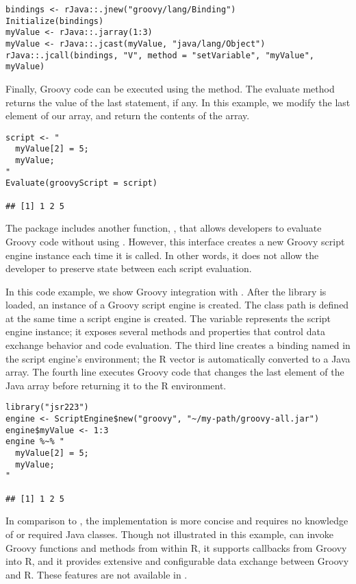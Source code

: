 \begin{verbatim}
bindings <- rJava::.jnew("groovy/lang/Binding")
Initialize(bindings)
myValue <- rJava::.jarray(1:3)
myValue <- rJava::.jcast(myValue, "java/lang/Object")
rJava::.jcall(bindings, "V", method = "setVariable", "myValue", myValue)
\end{verbatim}

Finally, Groovy code can be executed using the  method. The evaluate method returns the value of the last statement, if any. In this example, we modify the last element of our  array, and return the contents of the array.

\begin{verbatim}
script <- "
  myValue[2] = 5;
  myValue;
"
Evaluate(groovyScript = script)

## [1] 1 2 5
\end{verbatim}

The  package includes another function, , that allows developers to evaluate Groovy code without using . However, this interface creates a new Groovy script engine instance each time it is called. In other words, it does not allow the developer to preserve state between each script evaluation.

In this code example, we show Groovy integration with . After the library is loaded, an instance of a Groovy script engine is created. The class path is defined at the same time a script engine is created. The variable  represents the script engine instance; it exposes several methods and properties that control data exchange behavior and code evaluation. The third line creates a binding named  in the script engine's environment; the R vector is automatically converted to a Java array. The fourth line executes Groovy code that changes the last element of the  Java array before returning it to the R environment.

\begin{verbatim}
library("jsr223")
engine <- ScriptEngine$new("groovy", "~/my-path/groovy-all.jar")
engine$myValue <- 1:3
engine %~% "
  myValue[2] = 5;
  myValue;
"

## [1] 1 2 5
\end{verbatim}

In comparison to , the  implementation is more concise and requires no knowledge of  or required Java classes. Though not illustrated in this example,  can invoke Groovy functions and methods from within R, it supports callbacks from Groovy into R, and it provides extensive and configurable data exchange between Groovy and R. These features are not available in .

